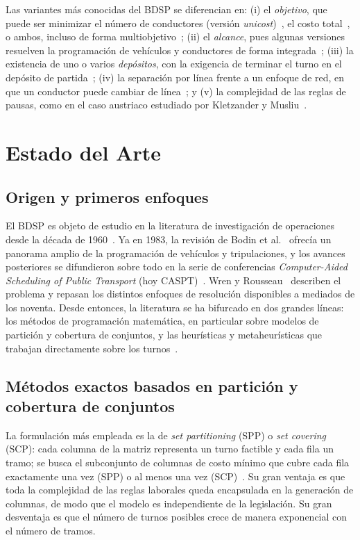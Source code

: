 \documentclass[letter, 10pt]{article}
\begin{document}
Las variantes más conocidas del BDSP se diferencian en: (i) el \emph{objetivo}, que puede ser minimizar el número de conductores (versión \emph{unicost})~\cite{Yunes2005}, el costo total~\cite{Constantino2017}, o ambos, incluso de forma multiobjetivo~\cite{Lourenco2001}; (ii) el \emph{alcance}, pues algunas versiones resuelven la programación de vehículos y conductores de forma integrada~\cite{Huisman2005}; (iii) la existencia de uno o varios \emph{depósitos}, con la exigencia de terminar el turno en el depósito de partida~\cite{DeLeone2011a}; (iv) la separación por línea frente a un enfoque de red, en que un conductor puede cambiar de línea~\cite{Portugal2009,Constantino2017}; y (v) la complejidad de las reglas de pausas, como en el caso austriaco estudiado por Kletzander y Musliu~\cite{Kletzander2020}.

\section{Estado del Arte}\label{sec:eda}

\subsection{Origen y primeros enfoques}
El BDSP es objeto de estudio en la literatura de investigación de operaciones desde la década de 1960~\cite{Constantino2017}. Ya en 1983, la revisión de Bodin et al.~\cite{Bodin1983} ofrecía un panorama amplio de la programación de vehículos y tripulaciones, y los avances posteriores se difundieron sobre todo en la serie de conferencias \emph{Computer-Aided Scheduling of Public Transport} (hoy CASPT)~\cite{Constantino2017}. Wren y Rousseau~\cite{WrenRousseau1995} describen el problema y repasan los distintos enfoques de resolución disponibles a mediados de los noventa. Desde entonces, la literatura se ha bifurcado en dos grandes líneas: los métodos de programación matemática, en particular sobre modelos de partición y cobertura de conjuntos, y las heurísticas y metaheurísticas que trabajan directamente sobre los turnos~\cite{Constantino2017}.

\subsection{Métodos exactos basados en partición y cobertura de conjuntos}
La formulación más empleada es la de \emph{set partitioning} (SPP) o \emph{set covering} (SCP): cada columna de la matriz representa un turno factible y cada fila un tramo; se busca el subconjunto de columnas de costo mínimo que cubre cada fila exactamente una vez (SPP) o al menos una vez (SCP)~\cite{Portugal2009,DeLeone2011a}. Su gran ventaja es que toda la complejidad de las reglas laborales queda encapsulada en la generación de columnas, de modo que el modelo es independiente de la legislación. Su gran desventaja es que el número de turnos posibles crece de manera exponencial con el número de tramos.
\end{document}
